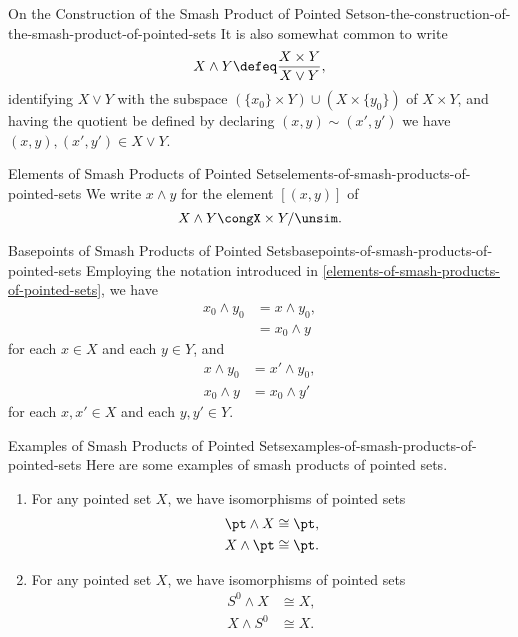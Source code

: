 \begin{remark}{On the Construction of the Smash Product of Pointed Sets}{on-the-construction-of-the-smash-product-of-pointed-sets}%
    It is also somewhat common to write
    \[
        X\wedge Y%
        \defeq%
        \frac{X\times Y}{X\vee Y},%
    \]%
    identifying $X\vee Y$ with the subspace $(\{x_{0}\}\times Y)\cup(X\times\{y_{0}\})$ of $X\times Y$, and having the quotient be defined by declaring $(x,y)\sim(x',y')$ \textiff we have $(x,y),(x',y')\in X\vee Y$.
\end{remark}
\begin{notation}{Elements of Smash Products of Pointed Sets}{elements-of-smash-products-of-pointed-sets}%
    We write $x\wedge y$ for the element $[(x,y)]$ of
    \[
        X\wedge Y%
        \cong%
        X\times Y/\unsim.%
    \]%
\end{notation}
\begin{remark}{Basepoints of Smash Products of Pointed Sets}{basepoints-of-smash-products-of-pointed-sets}%
    Employing the notation introduced in \cref{elements-of-smash-products-of-pointed-sets}, we have
    \begin{align*}
        x_{0}\wedge y_{0} &= x\wedge y_{0},\\%
                          &= x_{0}\wedge y%
    \end{align*}
    for each $x\in X$ and each $y\in Y$, and
    \begin{align*}
        x\wedge y_{0} &= x'\wedge y_{0},\\%
        x_{0}\wedge y &= x_{0}\wedge y'%
    \end{align*}
    for each $x,x'\in X$ and each $y,y'\in Y$.
\end{remark}
\begin{example}{Examples of Smash Products of Pointed Sets}{examples-of-smash-products-of-pointed-sets}%
    Here are some examples of smash products of pointed sets.
    \begin{enumerate}
        \item\label{examples-of-smash-products-of-pointed-sets-smashing-with-pt}For any pointed set $X$, we have isomorphisms of pointed sets
            \begin{align*}
                \pt\wedge X &\cong \pt,\\
                X\wedge\pt  &\cong \pt.
            \end{align*}
        \item\label{examples-of-smash-products-of-pointed-sets-smashing-with-s-zero}For any pointed set $X$, we have isomorphisms of pointed sets
            \begin{align*}
                S^{0}\wedge X &\cong X,\\
                X\wedge S^{0} &\cong X.
            \end{align*}
    \end{enumerate}
\end{example}
